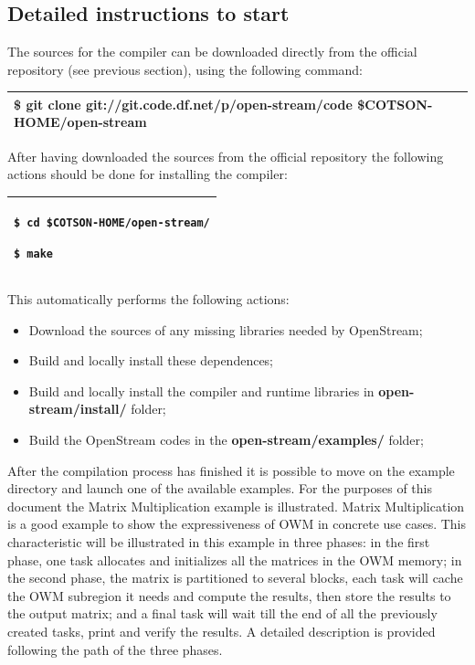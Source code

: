 \documentclass[a4paper]{article}
\begin{document}
\subsection[Detailed instructions to start]{Detailed instructions to
start}
{
The sources for the compiler can be downloaded directly from the
official repository (see previous section), using the following
command:}

\begin{flushleft}
\tablehead{}
\begin{supertabular}{|m{6.22196in}|}
\hline
{}\ttfamily \$ git clone
git://git.code.df.net/p/open-stream/code
\$COTSON-HOME/open-stream\\\hline
\end{supertabular}
\end{flushleft}
{
After having downloaded the sources from the official repository the
following actions should be done for installing the compiler:}

\begin{flushleft}
\tablehead{}
\begin{supertabular}{|m{6.22196in}|}
\hline
{ \texttt{\$ cd \$COTSON-HOME/open-stream/}}

 \texttt{\$ make}\texttt{ }\\\hline
\end{supertabular}
\end{flushleft}
{
This automatically performs the following actions:}

\begin{itemize}
\item {
Download the sources of any missing libraries needed by OpenStream;}
\item {
Build and locally install these dependences;}
\item {
Build and locally install the compiler and runtime libraries in
\textbf{open-stream/install/} folder;}
\item {
Build the OpenStream codes in the \textbf{open-stream/examples/}
folder;}
\end{itemize}
{
After the compilation process has finished it is possible to move on the
example directory and launch one of the available examples. For the
purposes of this document the Matrix Multiplication example is
illustrated. Matrix Multiplication is a good example to show the
expressiveness of OWM in concrete use cases. This characteristic will
be illustrated in this example in three phases: in the first phase, one
task allocates and initializes all the matrices in the OWM memory; in
the second phase, the matrix is partitioned to several blocks, each
task will cache the OWM subregion it needs and compute the results,
then store the results to the output matrix; and a final task will wait
till the end of all the previously created tasks, print and verify the
results. A detailed description is provided following the path of the
three phases.}
\end{document}
